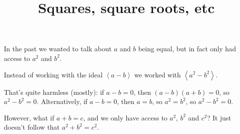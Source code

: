 \documentclass[a4paper, 14pt]{extarticle}
\title{Squares, square roots, etc}
\begin{document}
\maketitle

In the past we wanted to talk about $a$ and $b$ being equal, but in
fact only had access to $a^2$ and $b^2$.

Instead of working with the ideal $\left<a-b\right>$ we worked with
$\left<a^2-b^2\right>$.

That's quite harmless (mostly): if $a-b=0$, then $(a-b)(a+b)=0$, so
$a^2-b^2=0$. Alternatively, if $a-b=0$, then $a=b$, so $a^2=b^2$, so
$a^2-b^2=0$.


However, what if $a+b=c$, and we only have access to $a^2$, $b^2$ and
$c^2$? It just doesn't follow that $a^2+b^2=c^2$.
\end{document}

